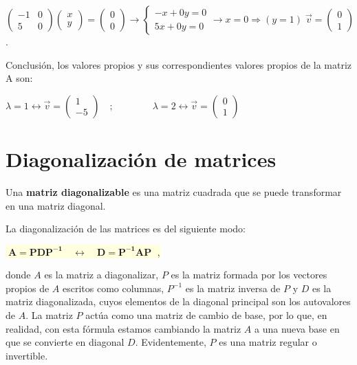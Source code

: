 \begin{cuadro-gris}
\noindent \small{ $\left( \begin{matrix} -1&0\\5&0 \end{matrix} \right)\left( \begin{matrix} x\\y \end{matrix} \right) = \left( \begin{matrix} 0\\0 \end{matrix} \right) \to \begin{cases} -x+0y=0\\5x+0y=0 \end{cases} \to x=0 \Rightarrow (y=1)\; 
\vec v=\left( \begin{matrix} 0\\1 \end{matrix} \right)$}\normalsize{.}

Conclusión, los valores propios y sus correspondientes valores propios de la matriz A son:

$\lambda=1 \leftrightarrow \vec v=\left( \begin{matrix} 1\\-5 \end{matrix} \right)
\quad; \qquad \qquad  
\lambda = 2 \leftrightarrow \vec v=\left( \begin{matrix} 0\\1 \end{matrix} \right)$
\end{cuadro-gris}


\section{Diagonalización de matrices}

\begin{definition}

Una \textbf{matriz diagonalizable} es una matriz cuadrada que se puede transformar en una matriz diagonal.	

La diagonalización de las matrices es del siguiente modo:

\vspace{4mm} \centerline{\colorbox{LightYellow}{$\boxed{ \; \boldsymbol{A=PDP^{-1} \quad \leftrightarrow \quad D=P^{-1}AP}\; }$ ,}}

\justify

donde $A$ es la matriz a diagonalizar, $P$ es la matriz formada por los vectores propios de $A$ escritos como columnas, $P^{-1}$ es la matriz inversa de $P$ y $D$ es la matriz diagonalizada, cuyos elementos de la diagonal principal son los autovalores de $A$. \textcolor{gris}{La matriz $P$ actúa como una matriz de cambio de base, por lo que, en realidad, con esta fórmula estamos cambiando la matriz $A$ a una nueva base en que se convierte en diagonal $D$. Evidentemente, $P$ es una matriz regular o invertible.} 
\end{definition}


